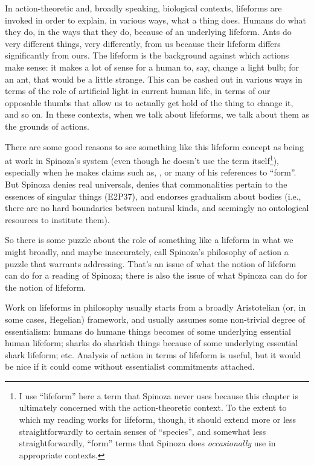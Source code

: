\documentclass{article}
\newcommand{\dash}{\unskip{—}}
\begin{document}
In action-theoretic \dash and, broadly speaking, biological \dash contexts, lifeforms are invoked in order to explain, in various ways, what a thing does.
Humans do what they do, in the ways that they do, because of an underlying lifeform. Ants do very different things, very differently, from us because their lifeform differs significantly from ours. The lifeform is the background against which actions make sense: it makes a lot of sense for a human to, say, change a light bulb; for an ant, that would be a little strange. This can be cashed out in various ways \dash in terms of the role of artificial light in current human life, in terms of our opposable thumbs that allow us to actually get hold of the thing to change it, and so on. In these contexts, when we talk about lifeforms, we talk about them as the grounds of actions.

There are some good reasons to see something like this lifeform concept as being at work in Spinoza's system (even though he doesn't use the term itself\footnote{I use \enquote{lifeform} here \dash a term that Spinoza never uses \dash because this chapter is ultimately concerned with the action-theoretic context. To the extent to which my reading works for lifeform, though, it should extend more or less straightforwardly to certain senses of \enquote{species}, and somewhat less straightforwardly, \enquote{form} \dash terms that Spinoza does \emph{occasionally} use in appropriate contexts.}), especially when he makes claims such as, , or many of his references to \enquote{form}. But Spinoza denies real universals, denies that commonalities pertain to the essences of singular things (E2P37), and endorses gradualism about bodies (i.e., there are no hard boundaries between natural kinds, and seemingly no ontological resources to institute them).

So there is some puzzle about the role of something like a lifeform in what we might broadly, and maybe inaccurately, call Spinoza's philosophy of action \dash a puzzle that warrants addressing. That's an issue of what the notion of lifeform can do for a reading of Spinoza; there is also the issue of what Spinoza can do for the notion of lifeform.

Work on lifeforms in philosophy usually starts from a broadly Aristotelian (or, in some cases, Hegelian) framework, and usually assumes some non-trivial degree of essentialism: humans do humane things becomes of some underlying essential human lifeform; sharks do sharkish things because of some underlying essential shark lifeform; etc. Analysis of action in terms of lifeform is useful, but it would be nice if it could come without essentialist commitments attached.
\end{document}
